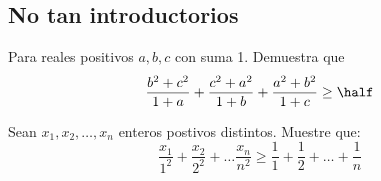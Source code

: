 \documentclass[11pt]{scrartcl}
\begin{document}
\subsection{No tan introductorios}
\begin{problem}
    Para reales positivos $a,b,c$ con suma 1. Demuestra que 
    \[\frac{b^2+c^2}{1+a}+\frac{c^2+a^2}{1+b}+\frac{a^2+b^2}{1+c}\geq \half\]
\end{problem}
\begin{problem}
\label{IMO1978-P5}
Sean $x_1, x_2, \dots, x_n$ enteros postivos distintos. Muestre que:
\begin{equation*}
    \frac{x_1}{1^2} + \frac{x_2}{2^2} + \dots \frac{x_n}{n^2} \geq \frac{1}{1} + \frac{1}{2} + \dots + \frac{1}{n}
\end{equation*}
\end{problem}
\end{document}
